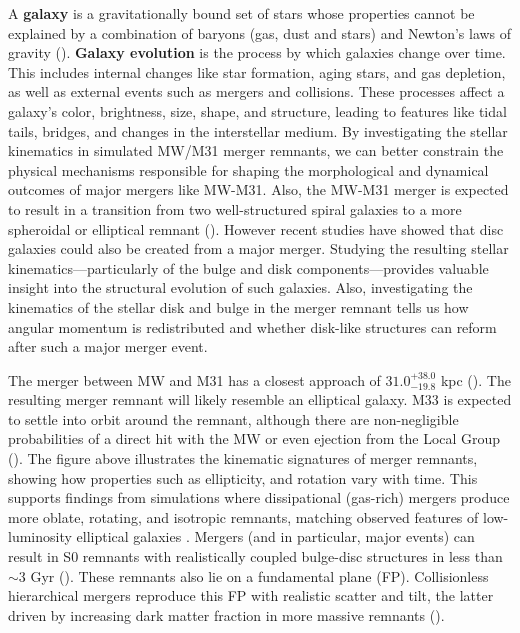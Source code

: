 \documentclass[twocolumn,linenumbers,trackchanges]{aastex7}
\begin{document}
A \textbf{galaxy} is a gravitationally bound set of stars whose properties cannot be explained by a combination of baryons (gas, dust and stars) and Newton’s laws of gravity (\cite{Willman_2012}). \textbf{Galaxy evolution} is the process by which galaxies change over time. This includes internal changes like star formation, aging stars, and gas depletion, as well as external events such as mergers and collisions. These processes affect a galaxy’s color, brightness, size, shape, and structure, leading to features like tidal tails, bridges, and changes in the interstellar medium. By investigating the stellar kinematics in simulated MW/M31 merger remnants, we can better constrain the physical mechanisms responsible for shaping the morphological and dynamical outcomes of major mergers like MW-M31.   Also, the MW-M31 merger is expected to result in a transition from two well-structured spiral galaxies to a more spheroidal or elliptical remnant (\cite{1972ApJ...178..623T}). However recent studies have showed that
disc galaxies could also be created from a major merger.  Studying the resulting stellar kinematics—particularly of the bulge and disk components—provides valuable insight into the structural evolution of such galaxies.  Also,  investigating the kinematics of the stellar disk and bulge in the merger remnant tells us  how angular momentum is redistributed and whether disk-like structures can reform after such a major merger event.

The merger between MW and M31 has a closest approach of $31.0^{+38.0}_{-19.8}$ kpc (\cite{vandermarel2012}). The resulting merger remnant will likely resemble an elliptical galaxy. M33 is expected to settle into orbit around the remnant, although there are non-negligible probabilities of a direct hit with the MW or even ejection from the Local Group (\cite{vandermarel2012}).
The figure above illustrates the kinematic signatures of merger remnants, showing how properties such as ellipticity, and rotation vary with time. This supports findings from simulations where dissipational (gas-rich) mergers produce more oblate, rotating, and isotropic remnants, matching observed features of low-luminosity elliptical galaxies \citep{Cox_2006}. Mergers (and in particular, major events) can result in S0 remnants with realistically coupled bulge-disc structures in less than \(\sim \)3 Gyr (\cite{refId0}). These remnants also lie on a fundamental plane (FP). Collisionless hierarchical mergers reproduce this FP with realistic scatter and tilt, the latter driven by increasing dark matter fraction in more massive remnants (\cite{Taranu_2015}). 
\end{document}
